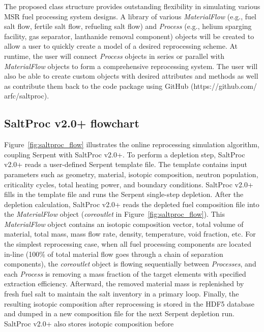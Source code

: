 \documentclass[12pt]{article} %
\begin{document}
The proposed class structure provides outstanding flexibility in simulating 
various \gls{MSR} fuel processing system designs. A library of various 
\textit{MaterialFlow} (e.g., fuel salt flow, fertile salt flow, refueling salt 
flow) and \textit{Process} (e.g., helium sparging facility, gas separator, 
lanthanide removal component) objects will be created to allow a user to 
quickly create a model of a desired reprocessing scheme. At runtime, the user 
will connect \textit{Process} objects in series or parallel with 
\textit{MaterialFlow} objects to form a comprehensive reprocessing system. The 
user will also be able to create custom objects with desired attributes and 
methods as well as contribute them back to the code package using GitHub 
(https://github.com/ arfc/saltproc).	

\subsection{SaltProc v2.0+ flowchart}
Figure~\ref{fig:saltproc_flow} illustrates the online reprocessing simulation 
algorithm, coupling Serpent with SaltProc v2.0+. To perform a depletion step, 
SaltProc v2.0+ reads a user-defined Serpent template file. The template  
contains input parameters such as geometry, material, isotopic composition, 
neutron population, criticality cycles, total heating power, and boundary 
conditions. SaltProc v2.0+ fills in the template file and runs the Serpent 
single-step depletion. After the depletion calculation, SaltProc v2.0+ reads 
the depleted fuel composition file into the \textit{MaterialFlow} object 
(\textit{core\textunderscore outlet} in Figure~\ref{fig:saltproc_flow}). This 
\textit{MaterialFlow} object contains an isotopic composition vector, total 
volume of material, total mass, mass flow rate, density, temperature, void 
fraction, etc. For the simplest reprocessing case, when all fuel processing 
components are located in-line (100\% of total material flow goes through 
a chain of separation components), the \textit{core\textunderscore outlet} 
object is flowing sequentially between \textit{Processes}, and each 
\textit{Process} is removing a mass fraction of the target elements with 
specified extraction efficiency. Afterward, the removed material mass is 
replenished by fresh fuel salt to maintain the salt inventory in a primary 
loop. Finally, the resulting isotopic composition after reprocessing is stored 
in the HDF5 database and dumped in a new composition file for the next 
Serpent depletion run. SaltProc v2.0+ also stores isotopic composition before 
\end{document}
